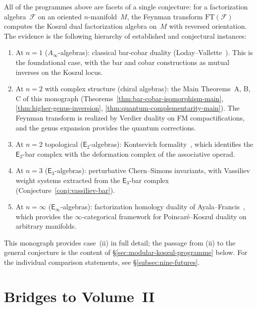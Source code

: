 \begin{remark}\label{rem:unifying-vision}
All of the programmes above are facets of a single conjecture:
for a factorization algebra~$\mathcal{F}$ on an oriented
$n$-manifold~$M$, the Feynman transform
$\mathrm{FT}(\mathcal{F})$ computes the Koszul dual
factorization algebra on~$M$ with reversed orientation.
The evidence is the following hierarchy of established and
conjectural instances:
\begin{enumerate}[label=\textup{(\roman*)}]
\item At $n = 1$ \textup{(}$A_\infty$-algebras\textup{)}:
  classical bar-cobar duality
  \textup{(}Loday--Vallette~\cite{LV12}\textup{)}.  This is the
  foundational case, with the bar and cobar constructions as mutual
  inverses on the Koszul locus.
\item At $n = 2$ with complex structure
  \textup{(}chiral algebras\textup{)}: the Main Theorems~A, B, C
  of this monograph
  \textup{(}Theorems~\ref{thm:bar-cobar-isomorphism-main},
  \ref{thm:higher-genus-inversion},
  \ref{thm:quantum-complementarity-main}\textup{)}.  The Feynman
  transform is realized by Verdier duality on FM compactifications,
  and the genus expansion provides the quantum corrections.
\item At $n = 2$ topological
  \textup{(}$\mathsf{E}_2$-algebras\textup{)}: Kontsevich
  formality~\cite{Kon03}, which identifies the $\mathsf{E}_2$-bar
  complex with the deformation complex of the associative operad.
\item At $n = 3$
  \textup{(}$\mathsf{E}_3$-algebras\textup{)}:
  perturbative Chern--Simons invariants, with Vassiliev weight
  systems extracted from the $\mathsf{E}_3$-bar complex
  \textup{(}Conjecture~\ref{conj:vassiliev-bar}\textup{)}.
\item At $n = \infty$
  \textup{(}$\mathsf{E}_\infty$-algebras\textup{)}:
  factorization homology duality of
  Ayala--Francis~\cite{AF15}, which provides the
  $\infty$-categorical framework for Poincar\'e--Koszul
  duality on arbitrary manifolds.
\end{enumerate}
This monograph provides case~(ii) in full detail; the passage
from (ii) to the general conjecture is the content of
\S\ref{sec:modular-koszul-programme} below.  For the individual comparison statements, see
\S\ref{subsec:nine-futures}.
\end{remark}


\section{Bridges to Volume~II}
\label{sec:cross-volume-bridges}

